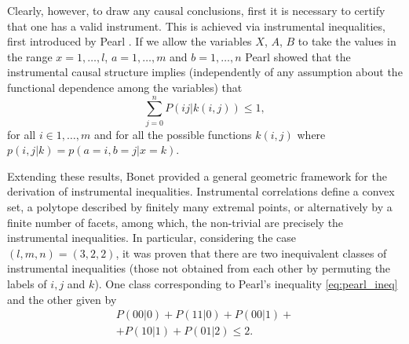 \documentclass[letterpaper]{article}
\begin{document}
Clearly, however, to draw any causal conclusions, first it is necessary to
certify that one has a valid instrument. This is achieved via instrumental
inequalities, first introduced by Pearl \cite{pearl1995}. If we allow the
variables $X$, $A$, $B$ to take the values in the range  $x=1,\dots,l$,
$a=1,\dots,m$ and $b=1,\dots,n$ Pearl showed that the instrumental causal
structure implies (independently of any assumption about the functional
dependence among the variables) that
\begin{equation} 
    \sum_{j=0}^{n} P(ij|k(i,j)) \le 1,
    \label{eq:pearl_ineq}
\end{equation}
for all $i \in {1,\ldots, m}$ and for all the possible functions $k(i,j)$
where $p(i,j|k) = p(a=i,b=j\vert x=k)$.

Extending these results, Bonet \cite{bonet2001} provided a general
geometric framework for the derivation of instrumental inequalities.
Instrumental correlations define a convex set, a polytope described
by finitely many extremal points, or alternatively by a finite number
of facets, among which, the non-trivial are precisely the instrumental
inequalities. In particular, considering the case $(l,m,n) = (3,2,2)$,
it was proven that there are two inequivalent classes of instrumental
inequalities (those not obtained from each other by permuting the
labels of $i,j$ and $k$). One class corresponding to Pearl's inequality
\eqref{eq:pearl_ineq} and the other given by
\begin{multline}
    P(0 0 | 0) + P(1 1 | 0) + 
    P(0 0 | 1) +\\+ P(1 0 | 1) + 
    P(0 1 | 2) \le 2.
    \label{eq:bonet_ineq}
\end{multline}
\end{document}

